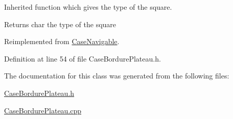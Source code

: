 Inherited function which gives the type of the square. 

\begin{DoxyReturn}{Returns}
char the type of the square 
\end{DoxyReturn}


Reimplemented from \hyperlink{class_case_navigable_aab2139bcd41029170ef2baf92bf2b412}{CaseNavigable}.



Definition at line 54 of file CaseBordurePlateau.h.



The documentation for this class was generated from the following files:\begin{DoxyCompactItemize}
\item 
\hyperlink{_case_bordure_plateau_8h}{CaseBordurePlateau.h}\item 
\hyperlink{_case_bordure_plateau_8cpp}{CaseBordurePlateau.cpp}\end{DoxyCompactItemize}
